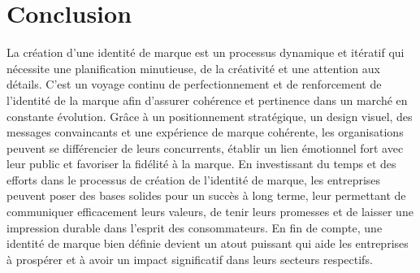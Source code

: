 \section{Conclusion}
La création d'une identité de marque est un processus dynamique et itératif qui nécessite une planification minutieuse, de la créativité et une attention aux détails. C'est un voyage continu de perfectionnement et de renforcement de l'identité de la marque afin d'assurer cohérence et pertinence dans un marché en constante évolution. Grâce à un positionnement stratégique, un design visuel, des messages convaincants et une expérience de marque cohérente, les organisations peuvent se différencier de leurs concurrents, établir un lien émotionnel fort avec leur public et favoriser la fidélité à la marque. En investissant du temps et des efforts dans le processus de création de l'identité de marque, les entreprises peuvent poser des bases solides pour un succès à long terme, leur permettant de communiquer efficacement leurs valeurs, de tenir leurs promesses et de laisser une impression durable dans l'esprit des consommateurs. En fin de compte, une identité de marque bien définie devient un atout puissant qui aide les entreprises à prospérer et à avoir un impact significatif dans leurs secteurs respectifs.
